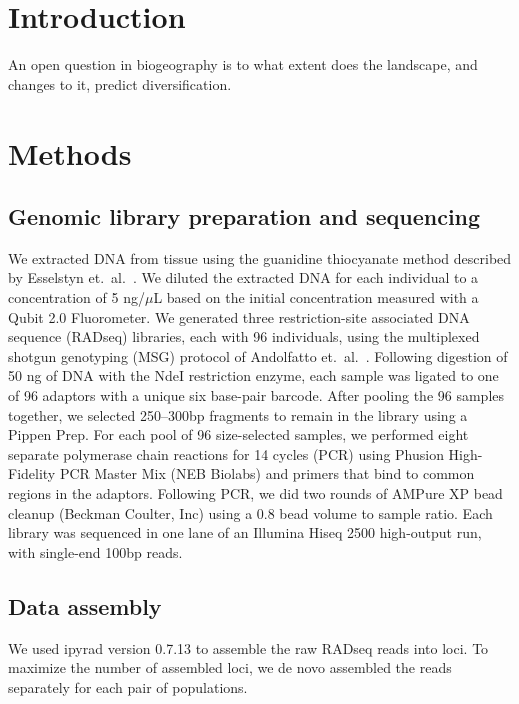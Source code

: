 \section{Introduction}

An open question in biogeography is to what extent does the landscape, and
changes to it, predict diversification.


\section{Methods}

\subsection{Genomic library preparation and sequencing}

We extracted DNA from tissue using the guanidine thiocyanate method described
by Esselstyn et.\ al.\ \citeyear{Esselstyn2008}.
We diluted the extracted DNA for each individual to a concentration of 5
ng/$\mu$L based on the initial concentration measured with a Qubit 2.0
Fluorometer.
We generated three restriction-site associated DNA sequence (RADseq) libraries,
each with 96 individuals, using the multiplexed shotgun genotyping (MSG)
protocol of Andolfatto et.\ al.\ \citep{Andolfatto2011}.
Following digestion of 50 ng of DNA with the NdeI restriction enzyme, each
sample was ligated to one of 96 adaptors with a unique six base-pair barcode.
After pooling the 96 samples together, we selected 250--300bp fragments to
remain in the library using a Pippen Prep.
For each pool of 96 size-selected samples, we performed eight separate
polymerase chain reactions for 14 cycles (PCR) using Phusion High-Fidelity PCR
Master Mix (NEB Biolabs) and primers that bind to common regions in the
adaptors.
Following PCR, we did two rounds of AMPure XP bead cleanup (Beckman Coulter,
Inc) using a 0.8 bead volume to sample ratio.
Each library was sequenced in one lane of an Illumina Hiseq 2500 high-output
run, with single-end 100bp reads.

\subsection{Data assembly}
We used ipyrad version 0.7.13 \citep{ipyrad0713} to assemble the raw RADseq
reads into loci.
To maximize the number of assembled loci, we de novo assembled the reads
separately for each pair of populations.

